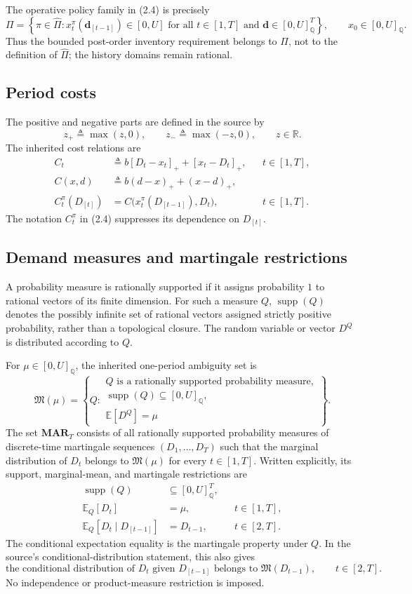\documentclass{article}
\begin{document}
The operative policy family in (2.4) is precisely
\[
\Pi=\left\{\pi\in\hat\Pi:
 x_t^\pi(\mathbf d_{[t-1]})\in[0,U]
 \text{ for all }t\in[1,T]\text{ and }
 \mathbf d\in[0,U]_{\mathbb{Q}}^T
 \right\},\qquad x_0\in[0,U]_{\mathbb{Q}}.
\]
Thus the bounded post-order inventory requirement belongs to \(\Pi\), not to the definition of \(\hat\Pi\); the history domains remain rational.

\subsection*{Period costs}
The positive and negative parts are defined in the source by
\[
z_+\triangleq\max(z,0),\qquad
z_-\triangleq\max(-z,0),\qquad z\in\mathbb{R}.
\]
The inherited cost relations are
\begin{align*}
C_t&\triangleq b[D_t-x_t]_+ +[x_t-D_t]_+,
&&t\in[1,T],\\
C(x,d)&\triangleq b(d-x)_+ +(x-d)_+,\\
C_t^\pi(D_{[t]})&=C\bigl(x_t^\pi(D_{[t-1]}),D_t\bigr),
&&t\in[1,T].
\end{align*}
The notation \(C_t^\pi\) in (2.4) suppresses its dependence on \(D_{[t]}\).

\subsection*{Demand measures and martingale restrictions}
A probability measure is rationally supported if it assigns probability \(1\) to rational vectors of its finite dimension. For such a measure \(Q\), \(\operatorname{supp}(Q)\) denotes the possibly infinite set of rational vectors assigned strictly positive probability, rather than a topological closure. The random variable or vector \(D^Q\) is distributed according to \(Q\).

For \(\mu\in[0,U]_{\mathbb{Q}}\), the inherited one-period ambiguity set is
\[
\mathfrak M(\mu)=
\left\{Q:\begin{array}{l}
Q\text{ is a rationally supported probability measure},\\
\operatorname{supp}(Q)\subseteq[0,U]_{\mathbb{Q}},\\
\mathbb{E}[D^Q]=\mu
\end{array}\right\}.
\]
The set \(\mathbf{MAR}_T\) consists of all rationally supported probability measures of discrete-time martingale sequences \((D_1,\ldots,D_T)\) such that the marginal distribution of \(D_t\) belongs to \(\mathfrak M(\mu)\) for every \(t\in[1,T]\). Written explicitly, its support, marginal-mean, and martingale restrictions are
\begin{align*}
\operatorname{supp}(Q)&\subseteq[0,U]_{\mathbb{Q}}^T,\\
\mathbb{E}_Q[D_t]&=\mu,
&&t\in[1,T],\\
\mathbb{E}_Q[D_t\mid D_{[t-1]}]&=D_{t-1},
&&t\in[2,T].
\end{align*}
The conditional expectation equality is the martingale property under \(Q\). In the source's conditional-distribution statement, this also gives
\[
\text{the conditional distribution of }D_t\text{ given }D_{[t-1]}
\text{ belongs to }\mathfrak M(D_{t-1}),\qquad t\in[2,T].
\]
No independence or product-measure restriction is imposed.
\end{document}

